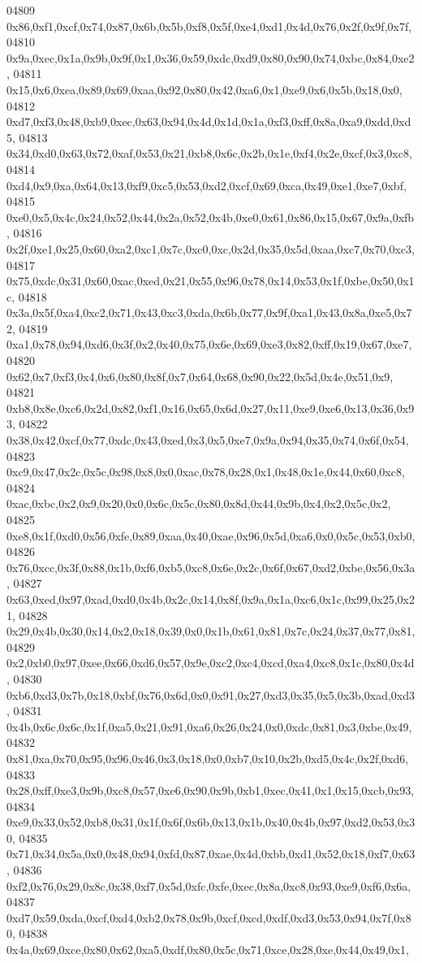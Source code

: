 \begin{DoxyCode}
04809   0x86,0xf1,0xcf,0x74,0x87,0x6b,0x5b,0xf8,0x5f,0xe4,0xd1,0x4d,0x76,0x2f,0x9f,0x7f,
04810   0x9a,0xec,0x1a,0x9b,0x9f,0x1,0x36,0x59,0xdc,0xd9,0x80,0x90,0x74,0xbc,0x84,0xe2,
04811   0x15,0x6,0xea,0x89,0x69,0xaa,0x92,0x80,0x42,0xa6,0x1,0xe9,0x6,0x5b,0x18,0x0,
04812   0xd7,0xf3,0x48,0xb9,0xec,0x63,0x94,0x4d,0x1d,0x1a,0xf3,0xff,0x8a,0xa9,0xdd,0xd5,
04813   0x34,0xd0,0x63,0x72,0xaf,0x53,0x21,0xb8,0x6c,0x2b,0x1e,0xf4,0x2e,0xcf,0x3,0xc8,
04814   0xd4,0x9,0xa,0x64,0x13,0xf9,0xc5,0x53,0xd2,0xcf,0x69,0xca,0x49,0xe1,0xe7,0xbf,
04815   0xe0,0x5,0x4c,0x24,0x52,0x44,0x2a,0x52,0x4b,0xe0,0x61,0x86,0x15,0x67,0x9a,0xfb,
04816   0x2f,0xe1,0x25,0x60,0xa2,0xc1,0x7c,0xc0,0xc,0x2d,0x35,0x5d,0xaa,0xc7,0x70,0xc3,
04817   0x75,0xdc,0x31,0x60,0xac,0xed,0x21,0x55,0x96,0x78,0x14,0x53,0x1f,0xbe,0x50,0x1c,
04818   0x3a,0x5f,0xa4,0xc2,0x71,0x43,0xc3,0xda,0x6b,0x77,0x9f,0xa1,0x43,0x8a,0xe5,0x72,
04819   0xa1,0x78,0x94,0xd6,0x3f,0x2,0x40,0x75,0x6e,0x69,0xe3,0x82,0xff,0x19,0x67,0xe7,
04820   0x62,0x7,0xf3,0x4,0x6,0x80,0x8f,0x7,0x64,0x68,0x90,0x22,0x5d,0x4e,0x51,0x9,
04821   0xb8,0x8e,0xc6,0x2d,0x82,0xf1,0x16,0x65,0x6d,0x27,0x11,0xe9,0xe6,0x13,0x36,0x93,
04822   0x38,0x42,0xcf,0x77,0xdc,0x43,0xed,0x3,0x5,0xe7,0x9a,0x94,0x35,0x74,0x6f,0x54,
04823   0xc9,0x47,0x2c,0x5c,0x98,0x8,0x0,0xac,0x78,0x28,0x1,0x48,0x1e,0x44,0x60,0xc8,
04824   0xac,0xbc,0x2,0x9,0x20,0x0,0x6c,0x5c,0x80,0x8d,0x44,0x9b,0x4,0x2,0x5c,0x2,
04825   0xe8,0x1f,0xd0,0x56,0xfe,0x89,0xaa,0x40,0xae,0x96,0x5d,0xa6,0x0,0x5c,0x53,0xb0,
04826   0x76,0xcc,0x3f,0x88,0x1b,0xf6,0xb5,0xc8,0x6e,0x2c,0x6f,0x67,0xd2,0xbe,0x56,0x3a,
04827   0x63,0xed,0x97,0xad,0xd0,0x4b,0x2c,0x14,0x8f,0x9a,0x1a,0xc6,0x1c,0x99,0x25,0x21,
04828   0x29,0x4b,0x30,0x14,0x2,0x18,0x39,0x0,0x1b,0x61,0x81,0x7c,0x24,0x37,0x77,0x81,
04829   0x2,0xb0,0x97,0xee,0x66,0xd6,0x57,0x9e,0xc2,0xc4,0xcd,0xa4,0xc8,0x1c,0x80,0x4d,
04830   0xb6,0xd3,0x7b,0x18,0xbf,0x76,0x6d,0x0,0x91,0x27,0xd3,0x35,0x5,0x3b,0xad,0xd3,
04831   0x4b,0x6c,0x6c,0x1f,0xa5,0x21,0x91,0xa6,0x26,0x24,0x0,0xdc,0x81,0x3,0xbe,0x49,
04832   0x81,0xa,0x70,0x95,0x96,0x46,0x3,0x18,0x0,0xb7,0x10,0x2b,0xd5,0x4c,0x2f,0xd6,
04833   0x28,0xff,0xe3,0x9b,0xc8,0x57,0xe6,0x90,0x9b,0xb1,0xec,0x41,0x1,0x15,0xcb,0x93,
04834   0xe9,0x33,0x52,0xb8,0x31,0x1f,0x6f,0x6b,0x13,0x1b,0x40,0x4b,0x97,0xd2,0x53,0x30,
04835   0x71,0x34,0x5a,0x0,0x48,0x94,0xfd,0x87,0xae,0x4d,0xbb,0xd1,0x52,0x18,0xf7,0x63,
04836   0xf2,0x76,0x29,0x8c,0x38,0xf7,0x5d,0xfc,0xfe,0xec,0x8a,0xc8,0x93,0xe9,0xf6,0x6a,
04837   0xd7,0x59,0xda,0xcf,0xd4,0xb2,0x78,0x9b,0xcf,0xcd,0xdf,0xd3,0x53,0x94,0x7f,0x80,
04838   0x4a,0x69,0xce,0x80,0x62,0xa5,0xdf,0x80,0x5c,0x71,0xce,0x28,0xe,0x44,0x49,0x1,

\end{DoxyCode}
